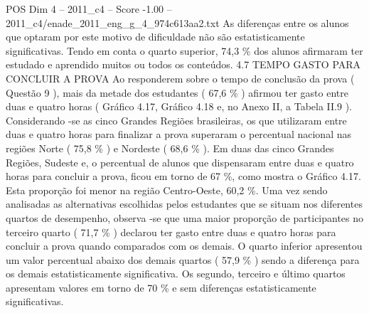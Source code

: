 \begin{textsample}{POS Dim 4 – 2011\_c4 – Score -1.00 – 2011\_c4/enade\_2011\_eng\_g\_4\_974c613aa2.txt}
As diferenças entre os alunos que optaram por este motivo de dificuldade não são estatisticamente significativas.
Tendo em conta o quarto superior, 74,3 \% dos alunos afirmaram ter estudado e aprendido muitos ou todos os conteúdos. 4.7 TEMPO GASTO PARA CONCLUIR A PROVA Ao responderem sobre o tempo de conclusão da prova ( Questão 9 ), mais da metade dos estudantes ( 67,6 \% ) afirmou ter gasto entre duas e quatro horas ( Gráfico 4.17, Gráfico 4.18 e, no Anexo II, a Tabela II.9 ).
Considerando -se as cinco Grandes Regiões brasileiras, os que utilizaram entre duas e quatro horas para finalizar a prova superaram o percentual nacional nas regiões Norte ( 75,8 \% ) e Nordeste ( 68,6 \% ).
Em duas das cinco Grandes Regiões, Sudeste e, o percentual de alunos que dispensaram entre duas e quatro horas para concluir a prova, ficou em torno de 67 \%, como mostra o Gráfico 4.17.
Esta proporção foi menor na região Centro-Oeste, 60,2 \%.
Uma vez sendo analisadas as alternativas escolhidas pelos estudantes que se situam nos diferentes quartos de desempenho, observa -se que uma maior proporção de participantes no terceiro quarto ( 71,7 \% ) declarou ter gasto entre duas e quatro horas para concluir a prova quando comparados com os demais.
O quarto inferior apresentou um valor percentual abaixo dos demais quartos ( 57,9 \% ) sendo a diferença para os demais estatisticamente significativa.
Os segundo, terceiro e último quartos apresentam valores em torno de 70 \% e sem diferenças estatisticamente significativas.

\end{textsample}
